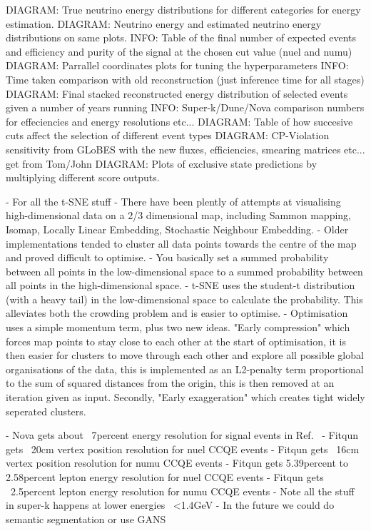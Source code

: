 DIAGRAM: True neutrino energy distributions for different categories for energy estimation.
DIAGRAM: Neutrino energy and estimated neutrino energy distributions on same plots.
INFO: Table of the final number of expected events and efficiency and purity of the signal at the chosen cut value (nuel and numu)
DIAGRAM: Parrallel coordinates plots for tuning the hyperparameters
INFO: Time taken comparison with old reconstruction (just inference time for all stages)
DIAGRAM: Final stacked reconstructed energy distribution of selected events given a number of years running
INFO: Super-k/Dune/Nova comparison numbers for effeciencies and energy resolutions etc...
DIAGRAM: Table of how succesive cuts affect the selection of different event types
DIAGRAM: CP-Violation sensitivity from GLoBES with the new fluxes, efficiencies, smearing matrices etc... get from Tom/John
DIAGRAM: Plots of exclusive state predictions by multiplying different score outputs.

- For all the t-SNE stuff
- There have been plently of attempts at visualising high-dimensional data on a 2/3 dimensional map, including Sammon mapping, Isomap, Locally Linear Embedding, Stochastic Neighbour Embedding.
- Older implementations tended to cluster all data points towards the centre of the map and proved difficult to optimise.
- You basically set a summed probability between all points in the low-dimensional space to a summed probability between all points in the high-dimensional space.
- t-SNE uses the student-t distribution (with a heavy tail) in the low-dimensional space to calculate the probability. This alleviates both the crowding problem and is easier to optimise.
- Optimisation uses a simple momentum term, plus two new ideas. "Early compression" which forces map points to stay close to each other at the start of optimisation, it is then easier for clusters to move through each other and explore all possible global organisations of the data, this is implemented as an L2-penalty term proportional to the sum of squared distances from the origin, this is then removed at an iteration given as input. Secondly, "Early exaggeration" which creates tight widely seperated clusters.

- Nova gets about ~7percent energy resolution for signal events
in Ref.~\cite{jiang2019}
- Fitqun gets ~20cm vertex position resolution for nuel CCQE events
- Fitqun gets ~16cm vertex position resolution for numu CCQE events
- Fitqun gets 5.39percent to 2.58percent lepton energy resolution for nuel CCQE events
- Fitqun gets ~2.5percent lepton energy resolution for numu CCQE events
- Note all the stuff in super-k happens at lower energies ~<1.4GeV
- In the future we could do semantic segmentation or use GANS

